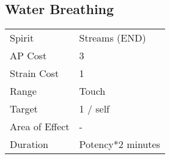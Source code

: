 \documentclass[11pt,a4paper,twocolumn]{book}
\begin{document}
%	
%
%
%




\subsection*{Water Breathing}
{
	\begin{tabu} to 70mm{| X[l,4] | X[l,7] |}
		\hline
		Spirit         & Streams (END)            \\
		AP Cost        & 3                        \\
		Strain Cost    & 1                        \\
		Range          & Touch                    \\
		Target         & 1 / self                 \\
		Area of Effect & -                        \\
		Duration       & Potency*2 minutes \\ \hline
	\end{tabu}
	
}
\medskip
\end{document}
